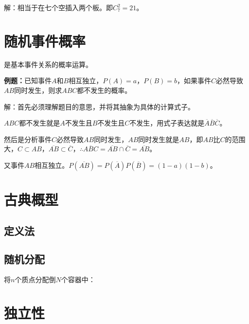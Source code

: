 \documentclass[UTF8, 12pt]{ctexart}
\begin{document}
解：相当于在七个空插入两个板。即$C_7^2=21$。

\section{随机事件概率}

是基本事件关系的概率运算。

\textbf{例题：}已知事件$A$和$B$相互独立，$P(A)=a$，$P(B)=b$，如果事件$C$必然导致$AB$同时发生，则求$ABC$都不发生的概率。

解：首先必须理解题目的意思，并将其抽象为具体的计算式子。

$ABC$都不发生就是$A$不发生且$B$不发生且$C$不发生，用式子表达就是$\overline{A}\overline{B}\overline{C}$。

然后是分析事件$C$必然导致$AB$同时发生，$AB$同时发生就是$AB$，即$AB$比$C$的范围大，$C\subset AB$，$\overline{AB}\subset\overline{C}$，$\therefore\overline{ABC}=\overline{AB}\cap\overline{C}=\overline{AB}$。

又事件$AB$相互独立。$P(\overline{AB})=P(\overline{A})P(\overline{B})=(1-a)(1-b)$。

\section{古典概型}

\subsection{定义法}

\subsection{随机分配}

将$n$个质点分配倒$N$个容器中：




\section{独立性}
\end{document}
